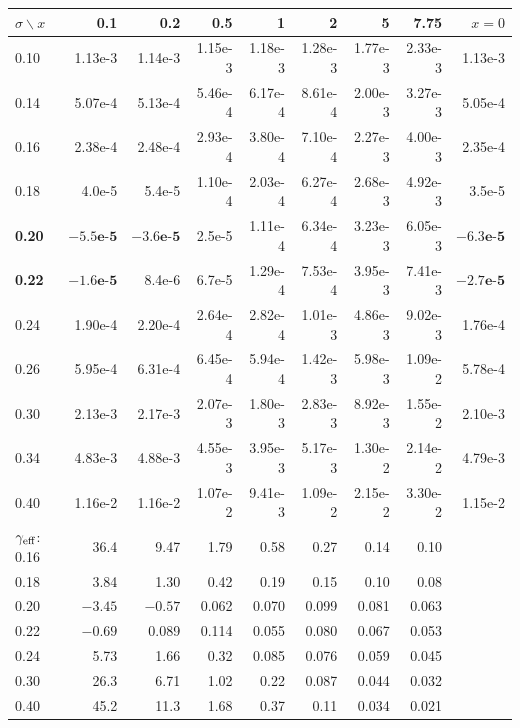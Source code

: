 \begin{center}\scriptsize
\begin{tabular}{l|rrrrrrr|r}\toprule
$\sigma\backslash x$ & 0.1 & 0.2 & 0.5 & 1 & 2 & 5 & 7.75 & $x=0$\\\midrule
0.10 & 1.13e-3 & 1.14e-3 & 1.15e-3 & 1.18e-3 & 1.28e-3 & 1.77e-3 & 2.33e-3 & 1.13e-3\\
0.14 & 5.07e-4 & 5.13e-4 & 5.46e-4 & 6.17e-4 & 8.61e-4 & 2.00e-3 & 3.27e-3 & 5.05e-4\\
0.16 & 2.38e-4 & 2.48e-4 & 2.93e-4 & 3.80e-4 & 7.10e-4 & 2.27e-3 & 4.00e-3 & 2.35e-4\\
0.18 & 4.0e-5 & 5.4e-5 & 1.10e-4 & 2.03e-4 & 6.27e-4 & 2.68e-3 & 4.92e-3 & 3.5e-5\\
\textbf{0.20} & $\mathbf{-5.5e\text{-}5}$ & $\mathbf{-3.6e\text{-}5}$ & 2.5e-5 & 1.11e-4 & 6.34e-4 & 3.23e-3 & 6.05e-3 & $\mathbf{-6.3e\text{-}5}$\\
\textbf{0.22} & $\mathbf{-1.6e\text{-}5}$ & 8.4e-6 & 6.7e-5 & 1.29e-4 & 7.53e-4 & 3.95e-3 & 7.41e-3 & $\mathbf{-2.7e\text{-}5}$\\
0.24 & 1.90e-4 & 2.20e-4 & 2.64e-4 & 2.82e-4 & 1.01e-3 & 4.86e-3 & 9.02e-3 & 1.76e-4\\
0.26 & 5.95e-4 & 6.31e-4 & 6.45e-4 & 5.94e-4 & 1.42e-3 & 5.98e-3 & 1.09e-2 & 5.78e-4\\
0.30 & 2.13e-3 & 2.17e-3 & 2.07e-3 & 1.80e-3 & 2.83e-3 & 8.92e-3 & 1.55e-2 & 2.10e-3\\
0.34 & 4.83e-3 & 4.88e-3 & 4.55e-3 & 3.95e-3 & 5.17e-3 & 1.30e-2 & 2.14e-2 & 4.79e-3\\
0.40 & 1.16e-2 & 1.16e-2 & 1.07e-2 & 9.41e-3 & 1.09e-2 & 2.15e-2 & 3.30e-2 & 1.15e-2\\\midrule
$\gamma_{\rm eff}$: 0.16 & 36.4 & 9.47 & 1.79 & 0.58 & 0.27 & 0.14 & 0.10 & \\
0.18 & 3.84 & 1.30 & 0.42 & 0.19 & 0.15 & 0.10 & 0.08 & \\
0.20 & $-3.45$ & $-0.57$ & 0.062 & 0.070 & 0.099 & 0.081 & 0.063 & \\
0.22 & $-0.69$ & 0.089 & 0.114 & 0.055 & 0.080 & 0.067 & 0.053 & \\
0.24 & 5.73 & 1.66 & 0.32 & 0.085 & 0.076 & 0.059 & 0.045 & \\
0.30 & 26.3 & 6.71 & 1.02 & 0.22 & 0.087 & 0.044 & 0.032 & \\
0.40 & 45.2 & 11.3 & 1.68 & 0.37 & 0.11 & 0.034 & 0.021 & \\\bottomrule
\end{tabular}
\end{center}
